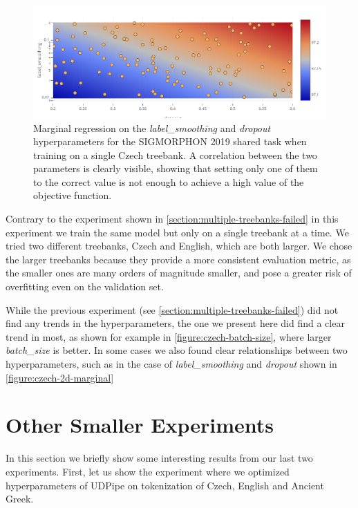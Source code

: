 \begin{figure}
	\begin{center}
		\includegraphics[width=1.0\textwidth]{images/czech-2d-marginal.png}
		\caption{Marginal regression on the \emph{label\_smoothing} and \emph{dropout} hyperparameters for the SIGMORPHON 2019 shared task when training on a single Czech treebank. A correlation between the two parameters is clearly visible, showing that setting only one of them to the correct value is not enough to achieve a high value of the objective function.}
		\label{figure:czech-2d-marginal}
	\end{center}
\end{figure}

Contrary to the experiment shown in \autoref{section:multiple-treebanks-failed} in this experiment we train the same model but only on a single treebank at a time. We tried two different treebanks, Czech and English, which are both larger. We chose the larger treebanks because they provide a more consistent evaluation metric, as the smaller ones are many orders of magnitude smaller, and pose a greater risk of overfitting even on the validation set.

While the previous experiment (see \autoref{section:multiple-treebanks-failed}) did not find any trends in the hyperparameters, the one we present here did find a clear trend in most, as shown for example in \autoref{figure:czech-batch-size}, where larger \emph{batch\_size} is better. In some cases we also found clear relationships between two hyperparameters, such as in the case of \emph{label\_smoothing} and \emph{dropout} shown in \autoref{figure:czech-2d-marginal}


\section{Other Smaller Experiments}

In this section we briefly show some interesting results from our last two experiments. First, let us show the experiment where we optimized hyperparameters of UDPipe \citep{udpipe:2017} on tokenization of Czech, English and Ancient Greek.

